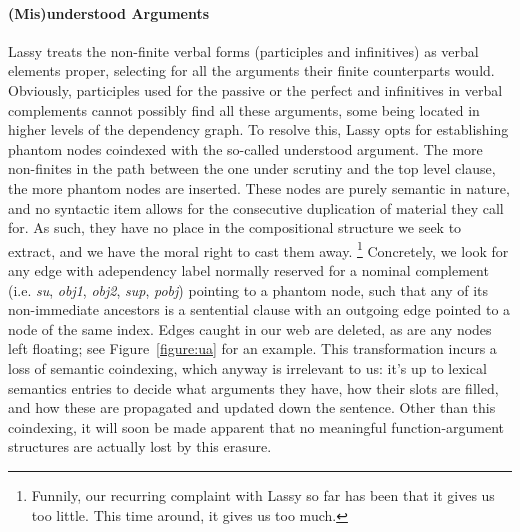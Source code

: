 \paragraph{(Mis)understood Arguments}
Lassy treats the non-finite verbal forms (participles and infinitives) as verbal elements proper, selecting for all the arguments their finite counterparts would.
Obviously, participles used for the passive or the perfect and infinitives in verbal complements cannot possibly find all these arguments, some being located in higher levels of the dependency graph.
To resolve this, Lassy opts for establishing phantom nodes coindexed with the so-called understood argument.
The more non-finites in the path between the one under scrutiny and the top level clause, the more phantom nodes are inserted.
These nodes are purely semantic in nature, and no syntactic item allows for the consecutive duplication of material they call for.
As such, they have no place in the compositional structure we seek to extract, and we have the moral right to cast them away.%
	\footnote{Funnily, our recurring complaint with Lassy so far has been that it gives us too little. 
	This time around, it gives us too much.}
Concretely, we look for any edge with adependency label normally reserved for a nominal complement (i.e. \textit{su}, \textit{obj1}, \textit{obj2}, \textit{sup}, \textit{pobj}) pointing to a phantom node, such that any of its non-immediate ancestors is a sentential clause with an outgoing edge pointed to a node of the same index.
Edges caught in our web are deleted, as are any nodes left floating; see Figure~\ref{figure:ua} for an example.
This transformation incurs a loss of semantic coindexing, which anyway is irrelevant to us: it's up to lexical semantics entries to decide what arguments they have, how their slots are filled, and how these are propagated and updated down the sentence.
Other than this coindexing, it will soon be made apparent that no meaningful function-argument structures are actually lost by this erasure.


